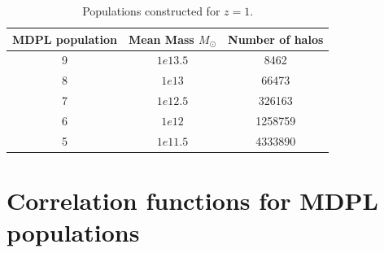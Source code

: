 \begin{table}
\begin{center}
  \begin{tabular}{ | c | c | c | }
    \hline \hline
    MDPL population & Mean Mass $M_{\odot}$& Number of halos \\ \hline \hline    
    9 & $ 1e13.5$ & 8462\\ \hline
    8 & $ 1e13$ & 66473 \\ \hline
    7 & $ 1e12.5$ & 326163 \\ \hline
    6 & $ 1e12$ & 1258759 \\ \hline
    5 & $ 1e11.5$ & 4333890 \\ \hline
  \end{tabular}  
   \caption{ Populations constructed for $z=1$. }
\label{z1}
\end{center}
\end{table}



\section{ Correlation functions for MDPL populations}


